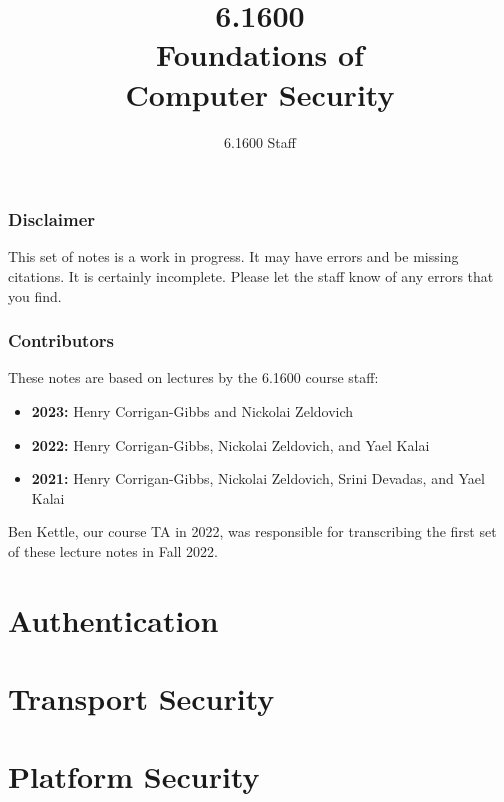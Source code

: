 \documentclass[
letterpaper, %
oneside,
nobib
]{tufte-book}
\author{6.1600 Staff}
\title{6.1600\\Foundations of\\Computer Security}
\begin{document}
\mainmatter

\maketitle

\section{Disclaimer}
This set of notes is a work in progress. It may have errors and be missing citations. It is certainly incomplete. Please let the staff know of any errors that you find.

\section{Contributors}
These notes are based on lectures by the 6.1600 course staff:
\begin{itemize}
  \item \textbf{2023:} Henry Corrigan-Gibbs and Nickolai Zeldovich
  \item \textbf{2022:} Henry Corrigan-Gibbs, Nickolai Zeldovich, and Yael Kalai
  \item \textbf{2021:} Henry Corrigan-Gibbs, Nickolai Zeldovich, Srini Devadas, and Yael Kalai
\end{itemize}
Ben Kettle, our course TA in 2022, was responsible for transcribing
the first set of these lecture notes in Fall 2022.

\clearpage

\tableofcontents*
\clearpage





\part{Authentication}







\part{Transport Security}





 


\part{Platform Security} 





\end{document}
